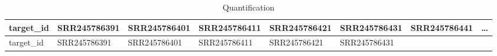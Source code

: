 \documentclass[
]{article}
\begin{document}
\begin{longtable}[]{@{}llllllll@{}}
\caption{\label{tab:Quantification}Quantification}\tabularnewline
\toprule
\begin{minipage}[b]{0.11\columnwidth}\raggedright
target\_id\strut
\end{minipage} & \begin{minipage}[b]{0.11\columnwidth}\raggedright
SRR245786391\strut
\end{minipage} & \begin{minipage}[b]{0.11\columnwidth}\raggedright
SRR245786401\strut
\end{minipage} & \begin{minipage}[b]{0.11\columnwidth}\raggedright
SRR245786411\strut
\end{minipage} & \begin{minipage}[b]{0.11\columnwidth}\raggedright
SRR245786421\strut
\end{minipage} & \begin{minipage}[b]{0.11\columnwidth}\raggedright
SRR245786431\strut
\end{minipage} & \begin{minipage}[b]{0.11\columnwidth}\raggedright
SRR245786441\strut
\end{minipage} & \begin{minipage}[b]{0.03\columnwidth}\raggedright
\ldots{}\strut
\end{minipage}\tabularnewline
\midrule
\endfirsthead
\toprule
\begin{minipage}[b]{0.11\columnwidth}\raggedright
target\_id\strut
\end{minipage} & \begin{minipage}[b]{0.11\columnwidth}\raggedright
SRR245786391\strut
\end{minipage} & \begin{minipage}[b]{0.11\columnwidth}\raggedright
SRR245786401\strut
\end{minipage} & \begin{minipage}[b]{0.11\columnwidth}\raggedright
SRR245786411\strut
\end{minipage} & \begin{minipage}[b]{0.11\columnwidth}\raggedright
SRR245786421\strut
\end{minipage} & \begin{minipage}[b]{0.11\columnwidth}\raggedright
SRR245786431\strut
\end{minipage} & \begin{minipage}[b]{0.11\columnwidth}\raggedright

\end{minipage}
\end{longtable}
\end{document}
